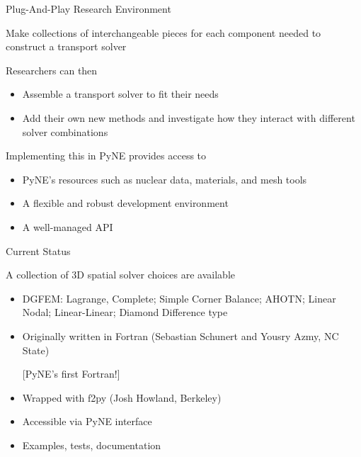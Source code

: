 \documentclass[xcolor=x11names,compress]{beamer}
\renewcommand{\(}{\begin{columns}}
\renewcommand{\)}{\end{columns}}
\newcommand{\<}[1]{\begin{column}{#1}}
\renewcommand{\>}{\end{column}}
\begin{document}
\begin{frame}{Plug-And-Play Research Environment}

    Make collections of \textcolor{dgreen}{interchangeable pieces} for each component
    needed to construct a transport solver
    
    \vspace*{1em}
    Researchers can then 
    \begin{itemize}
    \item \textcolor{dgreen}{Assemble} a transport solver to fit their needs
    \item \textcolor{dgreen}{Add} their own new methods and investigate how 
    they interact with different solver combinations
    \end{itemize}

    \vspace*{1em}
    Implementing this in PyNE provides access to 
    \begin{itemize}
    \item PyNE's \textcolor{dgreen}{resources} such as nuclear data, materials, 
    and mesh tools  
    \item A flexible and robust \textcolor{dgreen}{development environment} 
    \item A well-managed \textcolor{dgreen}{API}
    \end{itemize}

\end{frame}

\begin{frame}{Current Status}

    A collection of 3D spatial solver choices are available

    \renewcommand\windowpagestuff{%
    \texttt{[image: ../figs/spatial-cell]}
    \raggedright}
    \opencutright
    \vfill
    \begin{cutout}{9}{0.7\textwidth}{0pt}{2}
    \begin{itemize}
    \item DGFEM: Lagrange, Complete; Simple Corner Balance; AHOTN; Linear Nodal;
     Linear-Linear; Diamond Difference type
    
    \item Originally written in Fortran (Sebastian Schunert and Yousry Azmy,
    \textcolor{cardinal}{NC State})

    \hspace*{2 em}[PyNE's first Fortran!]
    
    \item Wrapped with f2py (Josh Howland, \textcolor{byellow}{Berkeley})
    \item Accessible via PyNE interface   
    \item Examples, tests, documentation
    \end{itemize}
    \end{cutout}
    
\end{frame}
\end{document}
